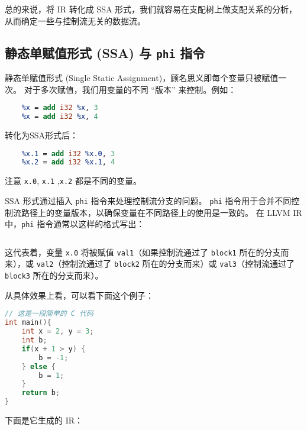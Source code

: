 总的来说，将 IR 转化成 SSA 形式，我们就容易在支配树上做支配关系的分析，从而确定一些与控制流无关的数据流。

\subsection{静态单赋值形式 (SSA) 与 \texttt{phi} 指令}

静态单赋值形式 (Single Static Assignment)，顾名思义即每个变量只被赋值一次。
对于多次赋值，我们用变量的不同 “版本” 来控制。例如：
\begin{lstlisting}[language=LLVM]
    %x = add i32 1, 2
    %x = add i32 %x, 3
    %x = add i32 %x, 4
\end{lstlisting}

转化为SSA形式后：
\begin{lstlisting}[language=LLVM]
    %x.0 = add i32 1, 2
    %x.1 = add i32 %x.0, 3
    %x.2 = add i32 %x.1, 4
\end{lstlisting}

注意 \texttt{x.0}, \texttt{x.1} ,\texttt{x.2} 都是不同的变量。

SSA 形式通过插入 \texttt{phi} 指令来处理控制流分支的问题。
\texttt{phi} 指令用于合并不同控制流路径上的变量版本，以确保变量在不同路径上的使用是一致的。
在 LLVM IR 中，\texttt{phi} 指令通常以这样的格式写出：
\begin{lstlisting}[language=LLVM]
    %x.0 = phi <type> [ <val1>, <block1> ], [ <val2>, <block2> ], [ <val3>, <block3> ]
\end{lstlisting}

这代表着，变量 \texttt{x.0} 将被赋值 \texttt{val1}（如果控制流通过了 \texttt{block1}
所在的分支而来），或 \texttt{val2}（控制流通过了 \texttt{block2}
所在的分支而来）或 \texttt{val3}（控制流通过了 \texttt{block3} 所在的分支而来）。

从具体效果上看，可以看下面这个例子：
\begin{lstlisting}[language=C]
// 这是一段简单的 C 代码
int main(){
    int x = 2, y = 3;
    int b;
    if(x + 1 > y) {
        b = -1;
    } else {
        b = 1;
    }
    return b;
}
\end{lstlisting}

下面是它生成的 IR：

